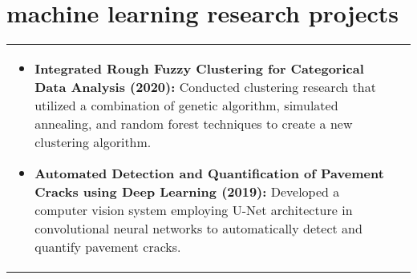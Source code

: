 \documentclass[a4paper,8pt]{article}
\begin{document}
\vspace{6pt}

\section{machine learning research projects}
\begin{tabularx}{\linewidth}{ @{}l r@{} }
\begin{minipage}[t]{\linewidth}
    \begin{itemize}[nosep,after=\strut, leftmargin=2em, itemsep=2pt]
        \item \textbf{Integrated Rough Fuzzy Clustering for Categorical Data Analysis (2020):} Conducted clustering research that utilized a combination of genetic algorithm, simulated annealing, and random forest techniques to create a new clustering algorithm.
        \item \textbf{Automated Detection and Quantification of Pavement Cracks using Deep Learning (2019):} Developed a computer vision system employing U-Net architecture in convolutional neural networks to automatically detect and quantify pavement cracks.
    \end{itemize}
    \end{minipage}
\end{tabularx}\\[3pt]
\end{document}
